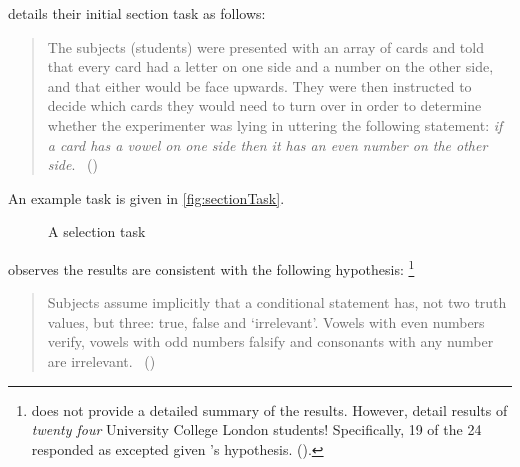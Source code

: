 \begin{note}
  \citeauthor{Wason:1966aa} details their initial section task as follows:

  \begin{quote}
    The subjects (students) were presented with an array of cards and told that every card had a letter on one side and a number on the other side, and that either would be face upwards.
    They were then instructed to decide which cards they would need to turn over in order to determine whether the experimenter was lying in uttering the following statement:
    \emph{if a card has a vowel on one side then it has an even number on the other side}.%
    \mbox{ }\hfill\mbox{(\citeyear[145--146]{Wason:1966aa})}
  \end{quote}

  An example task is given in \autoref{fig:sectionTask}.

  \begin{figure}[H]
    \centering
    \caption{A selection task}
    \label{fig:sectionTask}
  \end{figure}

  \citeauthor{Wason:1966aa} observes the results are consistent with the following hypothesis:%
  \footnote{
    \citeauthor{Wason:1966aa} does not provide a detailed summary of the results.
    However, \citeauthor{Johnson-Laird:1969aa} detail results of \emph{twenty four} University College London students!
    Specifically, 19 of the 24 responded as excepted given \citeauthor{Wason:1966aa}'s hypothesis.
    (\citeyear[369,370]{Johnson-Laird:1969aa}).
  }
  \begin{quote}
    Subjects assume implicitly that a conditional statement has, not two truth values, but three: true, false and `irrelevant'.
    Vowels with even numbers verify, vowels with odd numbers falsify and consonants with any number are irrelevant.%
    \mbox{ }\hfill\mbox{(\citeyear[146]{Wason:1966aa})}
  \end{quote}
\end{note}

